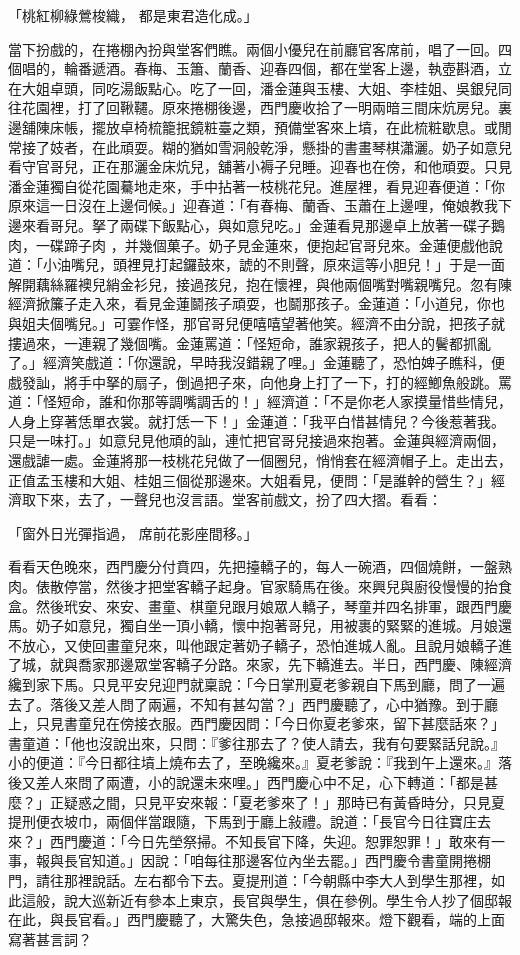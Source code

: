 「桃紅柳綠鶯梭織，  都是東君造化成。」

當下扮戲的，在捲棚內扮與堂客們瞧。兩個小優兒在前廳官客席前，唱了一回。四個唱的，輪番遞酒。春梅、玉簫、蘭香、迎春四個，都在堂客上邊，執壺斟酒，立在大姐卓頭，同吃湯飯點心。吃了一回，潘金蓮與玉樓、大姐、李桂姐、吳銀兒同往花園裡，打了回鞦韆。原來捲棚後邊，西門慶收拾了一明兩暗三間床炕房兒。裏邊舖陳床帳，擺放卓椅梳籠抿鏡粧臺之類，預備堂客來上墳，在此梳粧歇息。或閒常接了妓者，在此頑耍。糊的猶如雪洞般乾淨，懸掛的書畫琴棋瀟灑。奶子如意兒看守官哥兒，正在那灑金床炕兒，舖著小褥子兒睡。迎春也在傍，和他頑耍。只見潘金蓮獨自從花園驀地走來，手中拈著一枝桃花兒。進屋裡，看見迎春便道：「你原來這一日沒在上邊伺候。」迎春道：「有春梅、蘭香、玉蕭在上邊哩，俺娘教我下邊來看哥兒。拏了兩碟下飯點心，與如意兒吃。」金蓮看見那邊卓上放著一碟子鵝肉，一碟蹄子肉 ，并幾個菓子。奶子見金蓮來，便抱起官哥兒來。金蓮便戲他說道：「小油嘴兒，頭裡見打起鑼鼓來，諕的不則聲，原來這等小胆兒！」于是一面解開藕絲羅襖兒綃金衫兒，接過孩兒，抱在懷裡，與他兩個嘴對嘴親嘴兒。忽有陳經濟掀簾子走入來，看見金蓮鬬孩子頑耍，也鬬那孩子。金蓮道：「小道兒，你也與姐夫個嘴兒。」可霎作怪，那官哥兒便嘻嘻望著他笑。經濟不由分說，把孩子就摟過來，一連親了幾個嘴。金蓮罵道：「怪短命，誰家親孩子，把人的鬢都抓亂了。」經濟笑戲道：「你還說，早時我沒錯親了哩。」金蓮聽了，恐怕婢子瞧科，便戲發訕，將手中拏的扇子，倒過把子來，向他身上打了一下，打的經鯽魚般跳。罵道：「怪短命，誰和你那等調嘴調舌的！」經濟道：「不是你老人家摸量惜些情兒，人身上穿著恁單衣裳。就打恁一下！」金蓮道：「我平白惜甚情兒？今後惹著我。只是一味打。」如意兒見他頑的訕，連忙把官哥兒接過來抱著。金蓮與經濟兩個，還戲謔一處。金蓮將那一枝桃花兒做了一個圈兒，悄悄套在經濟帽子上。走出去，正值孟玉樓和大姐、桂姐三個從那邊來。大姐看見，便問：「是誰幹的營生？」經濟取下來，去了，一聲兒也沒言語。堂客前戲文，扮了四大摺。看看：

「窗外日光彈指過，  席前花影座間移。」

看看天色晚來，西門慶分付賁四，先把擡轎子的，每人一碗酒，四個燒餅，一盤熟肉。俵散停當，然後才把堂客轎子起身。官家騎馬在後。來興兒與廚役慢慢的抬食盒。然後玳安、來安、畫童、棋童兒跟月娘眾人轎子，琴童并四名排軍，跟西門慶馬。奶子如意兒，獨自坐一頂小轎，懷中抱著哥兒，用被裹的緊緊的進城。月娘還不放心，又使回畫童兒來，叫他跟定著奶子轎子，恐怕進城人亂。且說月娘轎子進了城，就與喬家那邊眾堂客轎子分路。來家，先下轎進去。半日，西門慶、陳經濟纔到家下馬。只見平安兒迎門就稟說：「今日掌刑夏老爹親自下馬到廳，問了一遍去了。落後又差人問了兩遍，不知有甚勾當？」西門慶聽了，心中猶豫。到于廳上，只見書童兒在傍接衣服。西門慶因問：「今日你夏老爹來，留下甚麼話來？」書童道：「他也沒說出來，只問：『爹往那去了？使人請去，我有句要緊話兒說。』小的便道：『今日都往墳上燒布去了，至晚纔來。』夏老爹說：『我到午上還來。』落後又差人來問了兩遭，小的說還未來哩。」西門慶心中不足，心下轉道：「都是甚麼？」正疑惑之間，只見平安來報：「夏老爹來了！」那時已有黃昏時分，只見夏提刑便衣坡巾，兩個伴當跟隨，下馬到于廳上敍禮。說道：「長官今日往寶庄去來？」西門慶道：「今日先塋祭掃。不知長官下降，失迎。恕罪恕罪！」敢來有一事，報與長官知道。」因說：「咱每往那邊客位內坐去罷。」西門慶令書童開捲棚門，請往那裡說話。左右都令下去。夏提刑道：「今朝縣中李大人到學生那裡，如此這般，說大巡新近有參本上東京，長官與學生，俱在參例。學生令人抄了個邸報在此，與長官看。」西門慶聽了，大驚失色，急接過邸報來。燈下觀看，端的上面寫著甚言詞？

